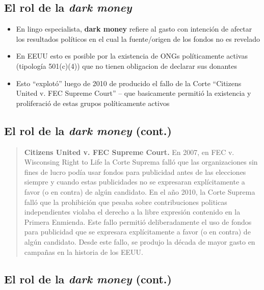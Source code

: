 \documentclass[
  letterpaper,
  DIV=11,
  numbers=noendperiod]{scrartcl}
\providecommand{\tightlist}{%
  \setlength{\itemsep}{0pt}\setlength{\parskip}{0pt}}\usepackage{longtable,booktabs,array}
\begin{document}
\subsection{\texorpdfstring{El rol de la \emph{dark
money}}{El rol de la dark money}}\label{el-rol-de-la-dark-money}

\begin{itemize}
\tightlist
\item
  En lingo especialista, \textbf{dark money} refiere al gasto con
  intención de afectar los resultados políticos en el cual la
  fuente/origen de los fondos no es revelado
\item
  En EEUU esto es posible por la existencia de ONGs políticamente
  activas (tipología 501(c)(4)) que no tienen obligacion de declarar sus
  donantes
\item
  Esto ``explotó'' luego de 2010 de producido el fallo de la Corte
  ``Citizens United v. FEC Supreme Court'' -- que basicamente permitió
  la existencia y proliferació de estas grupos políticamente activos
\end{itemize}

\subsection{\texorpdfstring{El rol de la \emph{dark money}
(cont.)}{El rol de la dark money (cont.)}}\label{el-rol-de-la-dark-money-cont.}

\begin{quote}
\textbf{Citizens United v. FEC Supreme Court.} En 2007, en FEC v.
Wisconsing Right to Life la Corte Suprema falló que las organizaciones
sin fines de lucro podía usar fondos para publicidad antes de las
elecciones siempre y cuando estas publicidades no se expresaran
explícitamente a favor (o en contra) de algún candidato. En el año 2010,
la Corte Suprema falló que la prohibición que pesaba sobre
contribuciones politicas independientes violaba el derecho a la libre
expresión contenido en la Primera Enmienda. Este fallo permitió
deliberadamente el uso de fondos para publicidad que se expresara
explícitamente a favor (o en contra) de algún candidato. Desde este
fallo, se produjo la década de mayor gasto en campañas en la historia de
los EEUU.
\end{quote}

\subsection{\texorpdfstring{El rol de la \emph{dark money}
(cont.)}{El rol de la dark money (cont.)}}\label{el-rol-de-la-dark-money-cont.-1}
\end{document}
